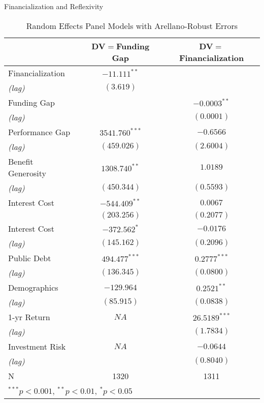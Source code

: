 \documentclass{beamer}
\begin{document}
\begin{frame}{\textmd{Financialization and Reflexivity}}
\begin{table}
\begin{tiny}
\begin{center}
\caption{Random Effects Panel Models with Arellano-Robust Errors} 
\begin{tabular}{l c c}
\hline
 & DV$=$Funding Gap & DV$=$Financialization \\
 \hline
Financialization    		  & $-11.111^{**}$    & \\
\hspace*{0.25cm} \emph{(lag)} & $(3.619)$ & \\
Funding Gap 					  & 			& $-0.0003^{**}$ \\
\hspace*{0.25cm} \emph{(lag)} &  			& $(0.0001)$    \\
Performance Gap    & $3541.760^{***}$  & $-0.6566$     \\
\hspace*{0.25cm} \emph{(lag)} & $(459.026)$  & $(2.6004)$ \\
Benefit Generosity    & $1308.740^{**}$   &  $1.0189$ 	\\
\hspace*{0.25cm} \emph{(lag)} & $(450.344)$  & $(0.5593)$  \\
Interest Cost            & $-544.409^{**}$   & $0.0067$  \\
                    & $(203.256)$ & $(0.2077)$  \\
Interest Cost    & $-372.562^{*}$    &   $-0.0176$       \\
\hspace*{0.25cm} \emph{(lag)} & $(145.162)$  &  $(0.2096)$ \\
Public Debt     & $494.477^{***}$   &   $0.2777^{***}$ \\
\hspace*{0.25cm} \emph{(lag)} & $(136.345)$  &  $(0.0800)$ \\
Demographics & $-129.964$  & $0.2521^{**}$   \\
\hspace*{0.25cm} \emph{(lag)}& $(85.915)$ & $(0.0838)$   \\
1-yr Return & $NA$ & $26.5189^{***}$    \\
\hspace*{0.25cm} \emph{(lag)} &  & $(1.7834)$ \\
Investment Risk  & $NA$  & $-0.0644$ \\
\hspace*{0.25cm} \emph{(lag)}&  & $(0.8040)$ \\
\hline
N & 1320 & 1311 \\
\hline
\multicolumn{3}{l}{$^{***}p<0.001$, $^{**}p<0.01$, $^*p<0.05$}
\end{tabular}
\end{center}
\end{tiny}
\end{table}
\end{frame}
\end{document}
